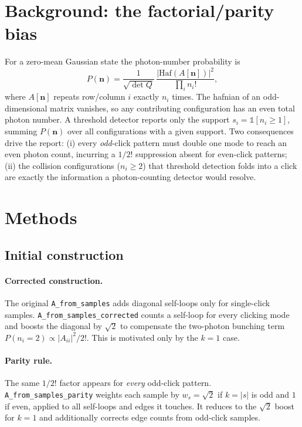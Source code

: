 \documentclass[11pt,a4paper]{article}
\begin{document}
\section{Background: the factorial/parity bias}

For a zero-mean Gaussian state the photon-number probability is
\begin{equation}
P(\mathbf{n})=\frac{1}{\sqrt{\det Q}}\,\frac{|\mathrm{Haf}(A[\mathbf{n}])|^{2}}
{\prod_i n_i!},
\end{equation}
where $A[\mathbf{n}]$ repeats row/column $i$ exactly $n_i$ times. The hafnian of
an odd-dimensional matrix vanishes, so any contributing configuration has an
even total photon number. A threshold detector reports only the support
$s_i=\mathbb{1}[n_i\ge 1]$, summing $P(\mathbf{n})$ over all configurations with
a given support. Two consequences drive the report: (i) every \emph{odd}-click
pattern must double one mode to reach an even photon count, incurring a $1/2!$
suppression absent for even-click patterns; (ii) the collision configurations
($n_i\ge 2$) that threshold detection folds into a click are exactly the
information a photon-counting detector would resolve.

\section{Methods}

\subsection{Initial construction}

\paragraph{Corrected construction.}
The original \texttt{A\_from\_samples} adds diagonal self-loops only for
single-click samples. \texttt{A\_from\_samples\_corrected} counts a self-loop
for every clicking mode and boosts the diagonal by $\sqrt{2}$ to compensate the
two-photon bunching term $P(n_i{=}2)\propto |A_{ii}|^2/2!$. This is motivated
only by the $k=1$ case.

\paragraph{Parity rule.}
The same $1/2!$ factor appears for \emph{every} odd-click pattern.
\texttt{A\_from\_samples\_parity} weights each sample by $w_s=\sqrt{2}$ if
$k=|s|$ is odd and $1$ if even, applied to all self-loops and edges it touches.
It reduces to the $\sqrt{2}$ boost for $k=1$ and additionally corrects edge
counts from odd-click samples.
\end{document}
